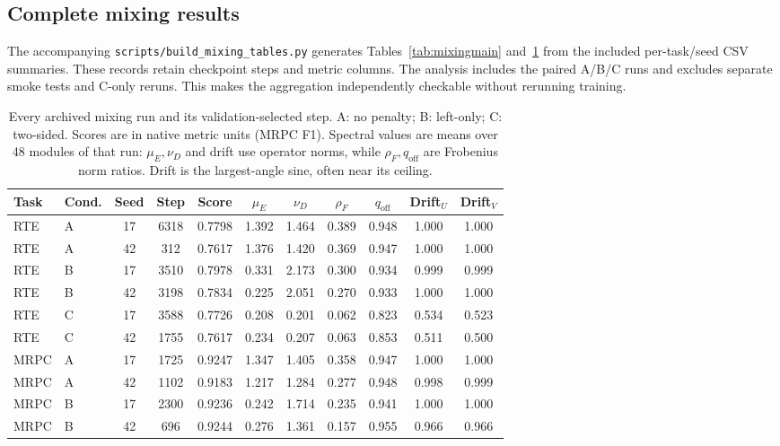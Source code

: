 \documentclass{article}
\newcommand{\off}{\mathrm{off}}
\begin{document}
\subsection{Complete mixing results}
\label{app:mixingtable}
The accompanying \texttt{scripts/build\_mixing\_tables.py} generates Tables~\ref{tab:mixingmain} and~\ref{tab:mixingfull} from the included per-task/seed CSV summaries. These records retain checkpoint steps and metric columns. The analysis includes the paired A/B/C runs and excludes separate smoke tests and C-only reruns. This makes the aggregation independently checkable without rerunning training.
\begin{table}[ht]
\centering
\caption{Every archived mixing run and its validation-selected step. A: no penalty; B: left-only; C: two-sided. Scores are in native metric units (MRPC F1). Spectral values are means over 48 modules of that run: $\mu_E,\nu_D$ and drift use operator norms, while $\rho_F,q_{\off}$ are Frobenius norm ratios. Drift is the largest-angle sine, often near its ceiling.}
\label{tab:mixingfull}
\begin{adjustbox}{max width=\linewidth}
\begin{tabular}{llccccccccc}
\toprule
Task & Cond. & Seed & Step & Score & $\mu_E$ & $\nu_D$ & $\rho_F$ & $q_{\off}$ & Drift$_U$ & Drift$_V$\\
\midrule
RTE & A & 17 & 6318 & 0.7798 & 1.392 & 1.464 & 0.389 & 0.948 & 1.000 & 1.000 \\
RTE & A & 42 & 312 & 0.7617 & 1.376 & 1.420 & 0.369 & 0.947 & 1.000 & 1.000 \\
RTE & B & 17 & 3510 & 0.7978 & 0.331 & 2.173 & 0.300 & 0.934 & 0.999 & 0.999 \\
RTE & B & 42 & 3198 & 0.7834 & 0.225 & 2.051 & 0.270 & 0.933 & 1.000 & 1.000 \\
RTE & C & 17 & 3588 & 0.7726 & 0.208 & 0.201 & 0.062 & 0.823 & 0.534 & 0.523 \\
RTE & C & 42 & 1755 & 0.7617 & 0.234 & 0.207 & 0.063 & 0.853 & 0.511 & 0.500 \\
\midrule
MRPC & A & 17 & 1725 & 0.9247 & 1.347 & 1.405 & 0.358 & 0.947 & 1.000 & 1.000 \\
MRPC & A & 42 & 1102 & 0.9183 & 1.217 & 1.284 & 0.277 & 0.948 & 0.998 & 0.999 \\
MRPC & B & 17 & 2300 & 0.9236 & 0.242 & 1.714 & 0.235 & 0.941 & 1.000 & 1.000 \\
MRPC & B & 42 & 696 & 0.9244 & 0.276 & 1.361 & 0.157 & 0.955 & 0.966 & 0.966 \\

\end{tabular}
\end{adjustbox}
\end{table}
\end{document}
